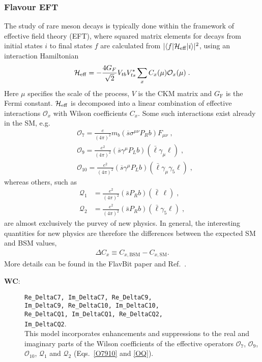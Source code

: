 \documentclass[pdftex,twocolumn,epjc3_preprint,runningheads]{svjour3}
\renewcommand{\_}{\discretionary{\underscore}{}{\underscore}}
\newcommand\term[1]{{\lstset{style=terminal}\lstinline!#1!\lstset{style=cpp}}}
\newcommand{\gsfitemc}[1]{\item[\textbf{\textsf{#1}}\label{#1}:]}
\newcommand{\flavbit}{\textsf{FlavBit}\xspace}
\begin{document}
\subsubsection{Flavour EFT}
\label{flavEFT}

The study of rare meson decays is typically done within the framework of effective field theory (EFT), where squared matrix elements for decays from initial states $i$ to final states $f$ are calculated from $|\langle f |{\cal H}_{\rm eff}|i\rangle|^2$, using an interaction Hamiltonian
\begin{equation}
\mathcal{H}_{\rm eff}  =  -\frac{4G_{F}}{\sqrt{2}} V_{tb} V_{ts}^{*} \sum_{x} C_{x}(\mu) \mathcal{O}_x(\mu)\;.
\end{equation}
Here $\mu$ specifies the scale of the process, $V$ is the CKM matrix and $G_\text{F}$ is the Fermi constant.  $\mathcal{H}_{\rm eff}$ is decomposed into a linear combination of effective interactions $\mathcal{O}_x$ with Wilson coefficients $C_x$.  Some such interactions exist already in the SM, e.g.\
\begin{align}
\label{O7910}
&\mathcal{O}_7 = \frac{e}{(4\pi)^2} m_b (\overline{s} \sigma^{\mu\nu} P_R b) F_{\mu\nu} \;,\nonumber \\
&\mathcal{O}_9 =  \frac{e^2}{(4\pi)^2} (\overline{s} \gamma^\mu P_L b) (\bar{\ell} \gamma_\mu \ell) \;,  \nonumber \\
&\mathcal{O}_{10} =  \frac{e^2}{(4\pi)^2} (\overline{s} \gamma^\mu P_L b) (\bar{\ell} \gamma_\mu \gamma_5 \ell) \;,
\end{align}
whereas others, such as
\begin{align}
\label{OQ}
\mathcal{Q}_{1}& = \frac{e^2}{(4\pi)^2}(\bar{s} P_R b)(\bar{\ell}\,\ell) \;,\nonumber \\
\mathcal{Q}_{2}& = \frac{e^2}{(4\pi)^2}(\bar{s} P_R b)(\bar{\ell}\gamma_5 \ell) \;,
\end{align}
are almost exclusively the purvey of new physics.  In general, the interesting quantities for new physics are therefore the differences between the expected SM and BSM values,
\begin{align}
\Delta C_x \equiv C_{x,\text{BSM}} - C_{x,\text{SM}}.
\end{align}
More details can be found in the \flavbit paper \cite{FlavBit} and Ref.\ \cite{Mahmoudi:2008tp}.

\begin{description}

\gsfitemc{WC} \term{Re_DeltaC7, Im_DeltaC7, Re_DeltaC9,}\\
              \term{Im_DeltaC9, Re_DeltaC10, Im_DeltaC10,}\\
              \term{Re_DeltaCQ1, Im_DeltaCQ1, Re_DeltaCQ2,}\\
              \term{Im_DeltaCQ2}.\\

This model incorporates enhancements and suppressions to the real and imaginary parts of the Wilson coefficients of the effective operators $\mathcal{O}_7$, $\mathcal{O}_9$, $\mathcal{O}_{10}$, $\mathcal{Q}_{1}$ and $\mathcal{Q}_{2}$ (Eqs.\ \ref{O7910} and \ref{OQ}).

\end{description}
\end{document}
